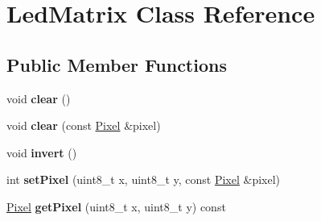 \hypertarget{class_led_matrix}{}\section{Led\+Matrix Class Reference}
\label{class_led_matrix}
\subsection*{Public Member Functions}
\begin{DoxyCompactItemize}
\item 
void {\bfseries clear} ()\hypertarget{class_led_matrix_a2737d95498692cc098be8edc8937ada6}{}\label{class_led_matrix_a2737d95498692cc098be8edc8937ada6}

\item 
void {\bfseries clear} (const \hyperlink{class_pixel}{Pixel} \&pixel)\hypertarget{class_led_matrix_ac9de9b5c9b37f13a1d9eec2d3d7970ed}{}\label{class_led_matrix_ac9de9b5c9b37f13a1d9eec2d3d7970ed}

\item 
void {\bfseries invert} ()\hypertarget{class_led_matrix_af1e9e51216169ec51398b259129de5e1}{}\label{class_led_matrix_af1e9e51216169ec51398b259129de5e1}

\item 
int {\bfseries set\+Pixel} (uint8\+\_\+t x, uint8\+\_\+t y, const \hyperlink{class_pixel}{Pixel} \&pixel)\hypertarget{class_led_matrix_a00eb3db37486902ee8509a95c1ac09fe}{}\label{class_led_matrix_a00eb3db37486902ee8509a95c1ac09fe}

\item 
\hyperlink{class_pixel}{Pixel} {\bfseries get\+Pixel} (uint8\+\_\+t x, uint8\+\_\+t y) const \hypertarget{class_led_matrix_a7f46ff6f7d413db5ac77225d47219397}{}\label{class_led_matrix_a7f46ff6f7d413db5ac77225d47219397}

\end{DoxyCompactItemize}
